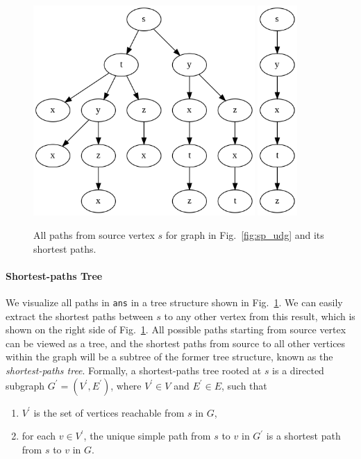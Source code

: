 \documentclass[../main.tex]{subfiles}
\begin{document}
\begin{figure}[!ht]
    \centering
    \includegraphics[width=0.6\columnwidth, height=8cm]{fig/all_paths_demo.png}
    \includegraphics[width=0.1\columnwidth, height=8cm]{fig/shortest_path_demo.png}
        \caption{All paths from source vertex $s$ for graph in Fig.~\ref{fig:sp_udg} and its shortest paths.}
    \label{fig:sp_udg_all_paths}
\end{figure}
\paragraph{Shortest-paths Tree} We visualize all paths in \texttt{ans} in a tree structure shown in Fig.~\ref{fig:sp_udg_all_paths}. We can easily extract the shortest paths between $s$ to any other vertex from this result, which is shown on the right side of Fig.~\ref{fig:sp_udg_all_paths}. All possible paths starting from source vertex can be viewed as a tree, and the shortest paths from source to all other vertices within the graph will be a subtree of the former tree structure, known as the \textit{shortest-paths tree}. Formally, a shortest-paths tree rooted at $s$ is a directed subgraph $G^{'}=(V^{'}, E^{'})$, where $V^{'}\in V$ and $E^{'}\in E$, such that
\begin{enumerate}
    \item $V^{'}$ is the set of vertices reachable from $s$ in $G$,
    \item for each $v \in V^{'}$, the unique simple path from $s$ to $v$ in $G^{'}$ is a shortest path from $s$ to $v$ in $G$.
\end{enumerate}
\end{document}
